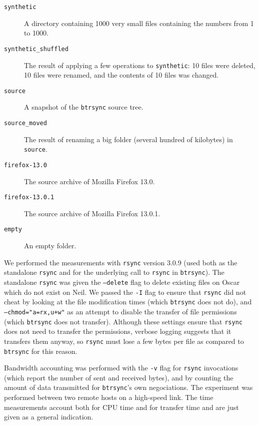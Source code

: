 \documentclass[11pt]{llncs}
\newcommand{\btrsync}{\texttt{btrsync}\xspace}
\newcommand{\rsync}{\texttt{rsync}\xspace}
\begin{document}
\begin{description}
  \item[\texttt{synthetic}] A directory containing 1000 very small files
    containing the numbers from 1 to 1000.
  \item[\texttt{synthetic\_shuffled}] The result of applying a few operations to
    \texttt{synthetic}: 10 files were deleted, 10 files were renamed, and the
    contents of 10 files was changed.
  \item[\texttt{source}] A snapshot of the \btrsync source tree.
  \item[\texttt{source\_moved}] The result of renaming a big folder (several
    hundred of kilobytes) in \texttt{source}.
  \item[\texttt{firefox-13.0}] The source archive of Mozilla Firefox 13.0.
  \item[\texttt{firefox-13.0.1}] The source archive of Mozilla Firefox 13.0.1.
  \item[\texttt{empty}] An empty folder.
\end{description}

We performed the measurements with \rsync version 3.0.9 (used both
as the standalone \rsync and for the underlying call to \rsync in
\btrsync). The standalone \rsync was given the \texttt{--delete} flag to delete
existing files on Oscar which do not exist on Neil. We passed the \texttt{-I}
flag to ensure that \rsync did not cheat by looking at the file modification
times (which \btrsync does not do), and \texttt{--chmod="a=rx,u+w"} as an
attempt to disable the transfer of file permissions (which \btrsync does not
transfer). Although these settings ensure that \rsync does not need to transfer
the permissions, verbose logging suggests that it transfers them anyway, so
\rsync must lose a few bytes per file as compared to \btrsync for this reason.

Bandwidth accounting was performed with the \texttt{-v} flag for \rsync
invocations (which report the number of sent and received bytes), and by
counting the amount of data transmitted for \btrsync's own negociations. The
experiment was performed between two remote hosts on a high-speed link. The time
measurements account both for CPU time and for transfer time and are just given
as a general indication.
\end{document}
